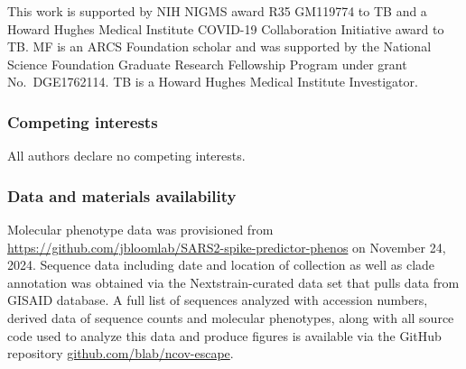 This work is supported by NIH NIGMS award R35 GM119774 to TB and a Howard Hughes Medical Institute COVID-19 Collaboration Initiative award to TB.
MF is an ARCS Foundation scholar and was supported by the National Science Foundation Graduate Research Fellowship Program under grant No.\ DGE1762114.
TB is a Howard Hughes Medical Institute Investigator.

\subsubsection*{Competing interests}

All authors declare no competing interests.

\subsubsection*{Data and materials availability}

Molecular phenotype data was provisioned from \href{https://github.com/jbloomlab/SARS2-spike-predictor-phenos}{https://github.com/jbloomlab/SARS2-spike-predictor-phenos} on November 24, 2024.
Sequence data including date and location of collection as well as clade annotation was obtained via the Nextstrain-curated data set that pulls data from GISAID database.
A full list of sequences analyzed with accession numbers, derived data of sequence counts and molecular phenotypes, along with all source code used to analyze this data and produce figures is available via the GitHub repository \href{https://github.com/blab/ncov-escape}{github.com/blab/ncov-escape}.
